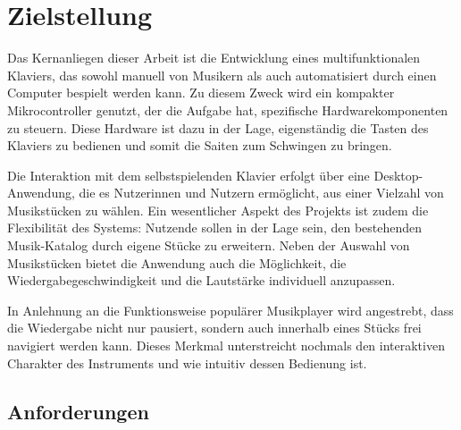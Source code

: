 \chapter{Zielstellung} \label{Zielstellung}

\nocite{*}


Das Kernanliegen dieser Arbeit ist die Entwicklung eines multifunktionalen Klaviers,
das sowohl manuell von Musikern als auch automatisiert durch einen Computer bespielt werden kann.
Zu diesem Zweck wird ein kompakter Mikrocontroller genutzt, der die Aufgabe hat, spezifische Hardwarekomponenten zu steuern.
Diese Hardware ist dazu in der Lage, eigenständig die Tasten des Klaviers zu bedienen und somit die Saiten zum Schwingen zu bringen.

Die Interaktion mit dem selbstspielenden Klavier erfolgt über eine Desktop-Anwendung, die es Nutzerinnen und Nutzern ermöglicht,
aus einer Vielzahl von Musikstücken zu wählen.
Ein wesentlicher Aspekt des Projekts ist zudem die Flexibilität des Systems: Nutzende sollen in der Lage sein,
den bestehenden Musik-Katalog durch eigene Stücke zu erweitern.
Neben der Auswahl von Musikstücken bietet die Anwendung auch die Möglichkeit,
die Wiedergabegeschwindigkeit und die Lautstärke individuell anzupassen.

In Anlehnung an die Funktionsweise populärer Musikplayer wird angestrebt,
dass die Wiedergabe nicht nur pausiert, sondern auch innerhalb eines Stücks frei navigiert werden kann.
Dieses Merkmal unterstreicht nochmals den interaktiven Charakter des Instruments und wie intuitiv dessen Bedienung ist.


\newpage
\section{Anforderungen} \label{sec:zielstellung-anforderungen}

